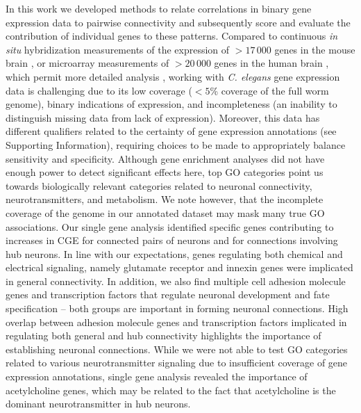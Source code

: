 \documentclass[10pt,letterpaper]{article}
\begin{document}
{%
In this work we developed methods to relate correlations in binary gene expression data to pairwise connectivity and subsequently score and evaluate the contribution of individual genes to these patterns.
Compared to continuous \emph{in situ} hybridization measurements of the expression of $>17\,000$ genes in the mouse brain \cite{Lein:2007jn}, or microarray measurements of $>20\,000$ genes in the human brain \cite{Hawrylycz:2012ky, Shen:2012ua}, which permit more detailed analysis \cite{Fulcher:2016ck, Ji:2014jw, Fakhry:2015kl, French2011, Vertes2016a, Parkes:2017dn}, working with \emph{C. elegans} gene expression data is challenging due to its low coverage ($<5$\% coverage of the full worm genome), binary indications of expression, and incompleteness (an inability to distinguish missing data from lack of expression).
Moreover, this data has different qualifiers related to the certainty of gene expression annotations (see Supporting Information), requiring choices to be made to appropriately balance sensitivity and specificity.
Although gene enrichment analyses did not have enough power to detect significant effects here, top GO categories point us towards biologically relevant categories related to neuronal connectivity, neurotransmitters, and metabolism.
We note however, that the incomplete coverage of the genome in our annotated dataset may mask many true GO associations.
Our single gene analysis identified specific genes contributing to increases in CGE for connected pairs of neurons and for connections involving hub neurons.
In line with our expectations, genes regulating both chemical and electrical signaling, namely glutamate receptor and innexin genes were implicated in general connectivity.
In addition, we also find multiple cell adhesion molecule genes and transcription factors that regulate neuronal development and fate specification -- both groups are important in forming neuronal connections.
High overlap between adhesion molecule genes and transcription factors implicated in regulating both general and hub connectivity highlights the importance of establishing neuronal connections.
While we were not able to test GO categories related to various neurotransmitter signaling due to insufficient coverage of gene expression annotations, single gene analysis revealed the importance of acetylcholine genes, which may be related to the fact that acetylcholine is the dominant neurotransmitter in hub neurons.
}
\end{document}
